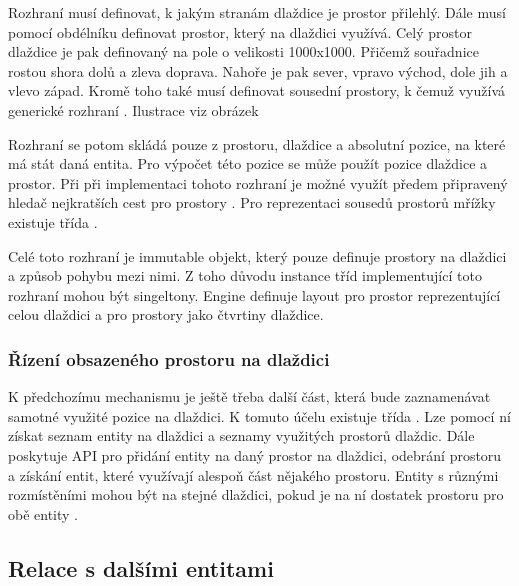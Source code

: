 
Rozhraní  musí definovat, k jakým stranám dlaždice je prostor přilehlý. Dále musí pomocí obdélníku definovat prostor, který na dlaždici využívá.
Celý prostor dlaždice je pak definovaný na pole o velikosti 1000x1000. Přičemž souřadnice rostou
shora dolů a zleva doprava. Nahoře je pak sever, vpravo východ, dole jih a vlevo západ. Kromě toho také musí definovat sousední
prostory, k čemuž využívá generické rozhraní . Ilustrace viz obrázek 



Rozhraní  se potom skládá pouze z prostoru, dlaždice a absolutní pozice, na které má stát daná entita.
Pro výpočet této pozice se může použít pozice dlaždice a prostor. Při při implementaci tohoto rozhraní je možné využít 
předem připravený hledač nejkratších cest pro prostory . Pro reprezentaci sousedů prostorů mřížky 
existuje třída .

Celé toto rozhraní je immutable objekt, který pouze definuje prostory na dlaždici a způsob pohybu mezi nimi. Z toho důvodu
instance tříd implementující toto rozhraní mohou být singeltony. Engine definuje layout pro prostor reprezentující celou dlaždici
a pro prostory jako čtvrtiny dlaždice.

\subsubsection{Řízení obsazeného prostoru na dlaždici}

K předchozímu mechanismu je ještě třeba další část, která bude zaznamenávat samotné využité pozice na dlaždici. K tomuto 
účelu existuje třída .  Lze pomocí ní získat seznam entity na dlaždici a seznamy využitých prostorů dlaždic.
Dále poskytuje API pro přidání entity na daný prostor na dlaždici, odebrání prostoru a získání entit, které využívají 
alespoň část nějakého prostoru. Entity s různými rozmístěními mohou být na stejné dlaždici, pokud
je na ní dostatek prostoru pro obě entity .


\subsection{Relace s dalšími entitami}\label{entities-relations}

